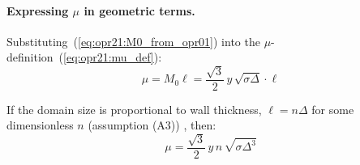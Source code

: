 \paragraph{Expressing $\mu$ in geometric terms.}
Substituting~(\ref{eq:opr21:M0_from_opr01}) into the $\mu$-definition~(\ref{eq:opr21:mu_def}):
\begin{equation}
    \boxed{\mu = M_0 \ell = \frac{\sqrt{3}}{2}\, y \, \sqrt{\sigma \Delta} \cdot \ell}
    \label{eq:opr21:mu_geometric}
\end{equation}

If the domain size is proportional to wall thickness, $\ell = n \Delta$ for some
dimensionless $n$ (assumption (A3)) \tagP{}, then:
\begin{equation}
    \mu = \frac{\sqrt{3}}{2}\, y \, n \, \sqrt{\sigma \Delta^3}
    \label{eq:opr21:mu_sigmaDelta}
\end{equation}

